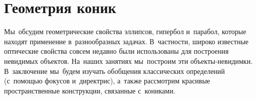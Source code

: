 
\section*{Геометрия коник}


Мы~обсудим геометрические свойства эллипсов, гипербол и~парабол, которые
находят применение в~разнообразных задачах.
В~частности, широко известные оптические свойства совсем недавно были
использованы для построения невидимых объектов.
На~наших занятиях мы~построим эти объекты-невидимки.
В~заключение мы~будем изучать обобщения классических определений (с~помощью
фокусов и~директрис), а~также рассмотрим красивые пространственные конструкции,
связанные с~кониками.

